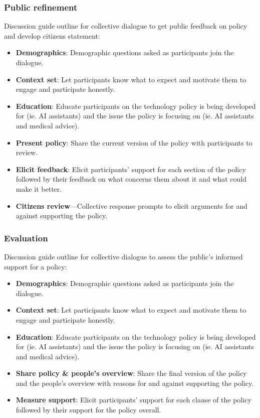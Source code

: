 \documentclass{article}
\begin{document}
\subsubsection{Public refinement}\label{A: public refinement}
Discussion guide outline for collective dialogue to get public feedback on policy and develop citizens statement:
\begin{itemize}
    \item \textbf{Demographics}: Demographic questions asked as participants join the dialogue. 
    \item \textbf{Context set}: Let participants know what to expect and motivate them to engage and participate honestly.
    \item \textbf{Education}: Educate participants on the technology policy is being developed for (ie. AI assistants) and the issue the policy is focusing on (ie. AI assistants and medical advice).
    \item \textbf{Present policy}: Share the current version of the policy with participants to review. 
    \item \textbf{Elicit feedback}: Elicit participants' support for each section of the policy followed by their feedback on what concerns them about it and what could make it better.
    \item \textbf{Citizens review}---Collective response prompts to elicit arguments for and against supporting the policy.
\end{itemize}

\subsubsection{Evaluation}\label{A:evaluation}
Discussion guide outline for collective dialogue to assess the public's informed support for a policy:
\begin{itemize}
    \item \textbf{Demographics}: Demographic questions asked as participants join the dialogue.
    \item \textbf{Context set}: Let participants know what to expect and motivate them to engage and participate honestly.
    \item \textbf{Education}: Educate participants on the technology policy is being developed for (ie. AI assistants) and the issue the policy is focusing on (ie. AI assistants and medical advice).
    \item \textbf{Share policy \& people's overview}: Share the final version of the policy and the people's overview with reasons for and against supporting the policy. 
    \item \textbf{Measure support}: Elicit participants’ support for each clause of the policy followed by their support for the policy overall.
\end{itemize}
\end{document}
